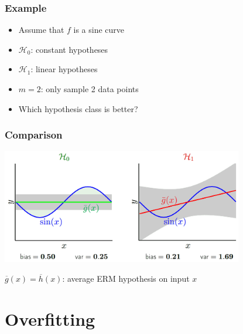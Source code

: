 \documentclass[10pt]{beamer}
\begin{document}
\begin{frame}
  \frametitle{Example}
  \begin{center}
  \end{center}
  \begin{itemize}
  \item Assume that $f$ is a sine curve
  \item $\mathcal{H}_0$: {\color{green} constant} hypotheses
  \item $\mathcal{H}_1$: {\color{red} linear} hypotheses
  \item $m=2$: only sample 2 data points
  \item Which hypothesis class is better?
  \end{itemize}
\end{frame}

\begin{frame}
  \frametitle{Comparison}
  \begin{center}
  \includegraphics[height=5cm]{images/sine.png}
  \end{center}
  $\overline{g}(x)=\overline{h}(x)$: {\color{purple} average} ERM hypothesis on input $x$
\end{frame}

\section{Overfitting}
\end{document}
